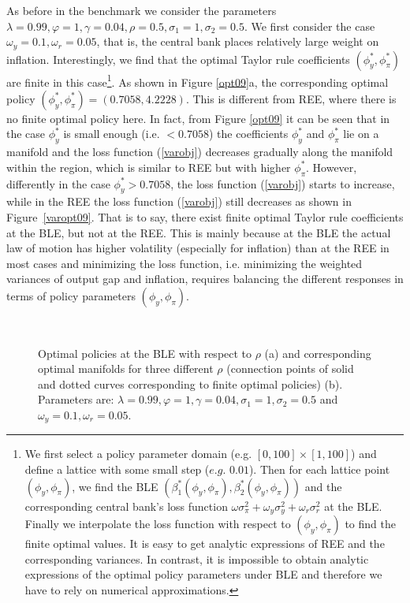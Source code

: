 \def\CTeXPreproc{Created by ctex v0.2.5, don't edit!}\documentclass[12pt]{article}
\numberwithin{equation}{section}
\begin{document}
As before in the benchmark we consider the parameters $\lambda=0.99, \varphi=1, \gamma=0.04, \rho=0.5, \sigma_1=1, \sigma_2=0.5$. We first consider the case $\omega_y=0.1,\omega_r=0.05$, that is, the central bank places relatively large weight on inflation. Interestingly, we find that the optimal Taylor rule coefficients $(\phi_y^*, \phi_\pi^*)$ are finite in this case\footnote{
We first select a policy parameter domain (e.g. $[0,100]\times[1,100]$) and define a lattice with some small step ($e.g. \,\,0.01$). Then for each lattice point $(\phi_y, \phi_\pi)$, we find the BLE $(\beta_1^*(\phi_y, \phi_\pi), \beta_2^*(\phi_y, \phi_\pi))$ and the corresponding central bank's loss function $\omega\sigma_\pi^2+\omega_y\sigma_y^2+\omega_r\sigma_r^2$ at the BLE. Finally we interpolate the loss function with respect to $(\phi_y, \phi_\pi)$ to find the finite optimal values. It is easy to get analytic expressions of REE and the corresponding variances. In contrast, it is impossible to obtain analytic expressions of the optimal policy parameters under BLE and  therefore we have to rely on numerical approximations. }.
As shown in Figure \ref{opt09}a, the corresponding optimal policy $(\phi_y^*, \phi_\pi^*)=(0.7058, 4.2228)$. %
This is different from REE, where there is no finite optimal policy here. In fact, from Figure \ref{opt09} it can be seen that in the case $\phi_y^*$ is small enough (i.e. $<0.7058$) the coefficients $\phi_y^*$ and $\phi_\pi^*$ lie on a manifold and the loss function (\ref{varobj}) decreases gradually along the manifold within the region, which is similar to REE but with higher $\phi_\pi^*$. However, differently in the case $\phi_y^*>0.7058$, the loss function (\ref{varobj}) starts to increase, while in the REE the loss function (\ref{varobj}) still decreases as shown in Figure~\ref{varopt09}. That is to say, there exist finite optimal Taylor rule coefficients at the BLE, but not at the REE. This is mainly because at the BLE the actual law of motion has higher volatility (especially for inflation) than at the REE in most cases and minimizing the loss function, i.e. minimizing the weighted variances of output gap and inflation, requires balancing the different responses in terms of policy parameters $(\phi_y, \phi_\pi)$.





\begin{figure}
    \begin{center}
        \mbox{\quad
        }
   \end{center}
   \caption{\label{optrho}  Optimal policies at the BLE with respect to $\rho$ (a) and corresponding optimal manifolds for three different $\rho$ (connection points of solid and dotted curves corresponding to finite optimal policies) (b). Parameters are: $\lambda=0.99, \varphi=1, \gamma=0.04,\sigma_1=1,\sigma_2=0.5$ and $\omega_y=0.1,\omega_r=0.05$.}
    \end{figure}
\end{document}
